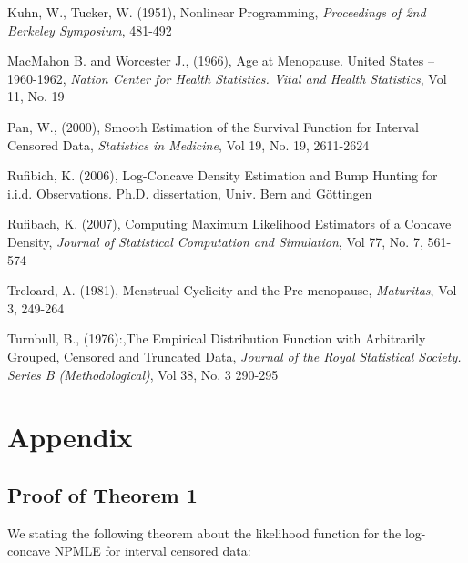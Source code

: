 \documentclass[10pt]{article}
\begin{document}
Kuhn, W., Tucker, W. (1951), Nonlinear Programming, \emph{Proceedings of 2nd Berkeley Symposium}, 481-492

\vspace{3mm}

MacMahon B. and Worcester J., (1966), Age at Menopause. United States -- 1960-1962, \emph{Nation Center for Health Statistics. Vital and Health Statistics}, Vol 11, No. 19

\vspace{3mm}

Pan, W., (2000), Smooth Estimation of the Survival Function for Interval Censored Data, \emph{Statistics in Medicine}, Vol 19, No. 19, 2611-2624

\vspace{3mm}

Rufibich, K. (2006), Log-Concave Density Estimation and Bump Hunting for i.i.d. Observations. Ph.D. dissertation, Univ. Bern and G\"ottingen
	
\vspace{3mm}

Rufibach, K. (2007), Computing Maximum Likelihood Estimators of a Concave Density, \emph{Journal of Statistical Computation and Simulation}, Vol 77, No. 7, 561-574

\vspace{3mm}

Treloard, A. (1981), Menstrual Cyclicity and the Pre-menopause, \emph{Maturitas}, Vol 3, 249-264

\vspace{3mm}

Turnbull, B., (1976):,The Empirical Distribution Function with Arbitrarily Grouped, Censored and Truncated Data, \emph{Journal of the Royal Statistical Society. Series B (Methodological)}, Vol 38, No. 3 290-295

\vspace{3mm}

	
{\section{Appendix} } 	

	\subsection{Proof of Theorem 1}
	
	We stating the following theorem about the likelihood function for the log-concave NPMLE for interval censored data:
		
\end{document}
